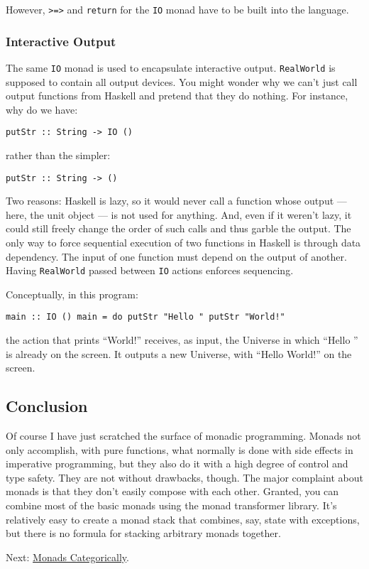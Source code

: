 However, \texttt{\textgreater{}=\textgreater{}} and \texttt{return} for
the \texttt{IO} monad have to be built into the language.

\subsubsection{Interactive Output}\label{interactive-output}

The same \texttt{IO} monad is used to encapsulate interactive output.
\texttt{RealWorld} is supposed to contain all output devices. You might
wonder why we can't just call output functions from Haskell and pretend
that they do nothing. For instance, why do we have:

\begin{verbatim}
putStr :: String -> IO ()
\end{verbatim}

rather than the simpler:

\begin{verbatim}
putStr :: String -> ()
\end{verbatim}

Two reasons: Haskell is lazy, so it would never call a function whose
output --- here, the unit object --- is not used for anything. And, even
if it weren't lazy, it could still freely change the order of such calls
and thus garble the output. The only way to force sequential execution
of two functions in Haskell is through data dependency. The input of one
function must depend on the output of another. Having \texttt{RealWorld}
passed between \texttt{IO} actions enforces sequencing.

Conceptually, in this program:

\begin{verbatim}
main :: IO () main = do putStr "Hello " putStr "World!"
\end{verbatim}

the action that prints ``World!'' receives, as input, the Universe in
which ``Hello '' is already on the screen. It outputs a new Universe,
with ``Hello World!'' on the screen.

\subsection{Conclusion}\label{conclusion}

Of course I have just scratched the surface of monadic programming.
Monads not only accomplish, with pure functions, what normally is done
with side effects in imperative programming, but they also do it with a
high degree of control and type safety. They are not without drawbacks,
though. The major complaint about monads is that they don't easily
compose with each other. Granted, you can combine most of the basic
monads using the monad transformer library. It's relatively easy to
create a monad stack that combines, say, state with exceptions, but
there is no formula for stacking arbitrary monads together.

Next:
\href{https://bartoszmilewski.com/2016/12/27/monads-categorically/}{Monads
Categorically}.
